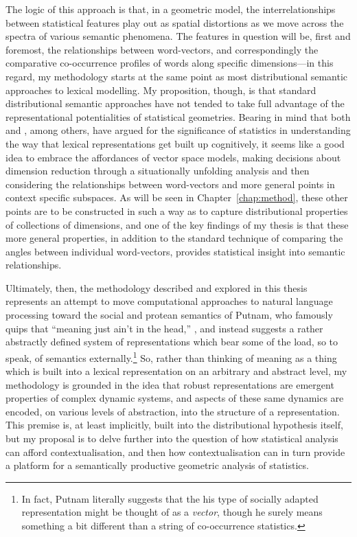 The logic of this approach is that, in a geometric model, the interrelationships between statistical features play out as spatial distortions as we move across the spectra of various semantic phenomena.  The features in question will be, first and foremost, the relationships between word-vectors, and correspondingly the comparative co-occurrence profiles of words along specific dimensions---in this regard, my methodology starts at the same point as most distributional semantic approaches to lexical modelling.  My proposition, though, is that standard distributional semantic approaches have not tended to take full advantage of the representational potentialities of statistical geometries.  Bearing in mind that both \cite{Barsalou2008} and \cite{Evans2009}, among others, have argued for the significance of statistics in understanding the way that lexical representations get built up cognitively, it seems like a good idea to embrace the affordances of vector space models, making decisions about dimension reduction through a situationally unfolding analysis and then considering the relationships between word-vectors and more general points in context specific subspaces.  As will be seen in Chapter~\ref{chap:method}, these other points are to be constructed in such a way as to capture distributional properties of collections of dimensions, and one of the key findings of my thesis is that these more general properties, in addition to the standard technique of comparing the angles between individual word-vectors, provides statistical insight into semantic relationships.

Ultimately, then, the methodology described and explored in this thesis represents an attempt to move computational approaches to natural language processing toward the social and protean semantics of Putnam, who famously quips that ``meaning just ain't in the head,'' \citep[][p. 144]{Putnam1975}, and instead suggests a rather abstractly defined system of representations which bear some of the load, so to speak, of semantics externally.\footnote{In fact, Putnam literally suggests that the his type of socially adapted representation might be thought of as a \emph{vector}, though he surely means something a bit different than a string of co-occurrence statistics.}  So, rather than thinking of meaning as a thing which is built into a lexical representation on an arbitrary and abstract level, my methodology is grounded in the idea that robust representations are emergent properties of complex dynamic systems, and aspects of these same dynamics are encoded, on various levels of abstraction, into the structure of a representation.  This premise is, at least implicitly, built into the distributional hypothesis itself, but my proposal is to delve further into the question of how statistical analysis can afford contextualisation, and then how contextualisation can in turn provide a platform for a semantically productive geometric analysis of statistics.

